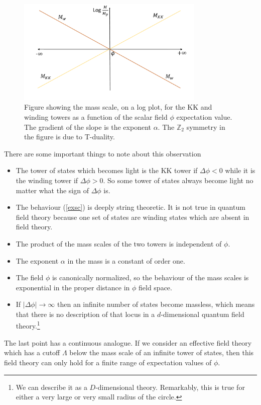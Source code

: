 \documentclass[11pt,a4paper]{article}
\numberwithin{equation}{section}
\numberwithin{table}{section}\setlength{\multlinegap}{25pt}
\begin{document}
\begin{figure}[t]
\centering
 \includegraphics[width=0.8\textwidth]{Figswtd.pdf}
\caption{Figure showing the mass scale, on a log plot, for the KK and winding towers as a function of the scalar field $\phi$ expectation value. The gradient of the slope is the exponent $\alpha$. The $\mathbb{Z}_2$ symmetry in the figure is due to T-duality.}
\label{fig:swtd}
\end{figure}
There are some important things to note about this observation
\begin{itemize}
\item The tower of states which becomes light is the KK tower if $\Delta \phi < 0$ while it is the winding tower if  $\Delta \phi > 0$. So some tower of states always become light no matter what the sign of $\Delta \phi$ is. 
\item The behaviour (\ref{exsc}) is deeply string theoretic. It is not true in quantum field theory because one set of states are winding states which are absent in field theory.
\item The product of the mass scales of the two towers is independent of $\phi$. 
\item The exponent $\alpha$ in the mass is a constant of order one. 
\item The field $\phi$ is canonically normalized, so the behaviour of the mass scales is exponential in the proper distance in $\phi$ field space. 
\item If $\left|\Delta \phi \right| \rightarrow \infty$ then an infinite number of states become massless, which means that there is no description of that locus in a $d$-dimensional quantum field theory.\footnote{We can describe it as a $D$-dimensional theory. Remarkably, this is true for either a very large or very small radius of the circle.}
\end{itemize}
The last point has a continuous analogue. If we consider an effective field theory which has a cutoff $\Lambda$ below the mass scale of an infinite tower of states, then this field theory can only hold for a finite range of expectation values of $\phi$. 
\end{document}
